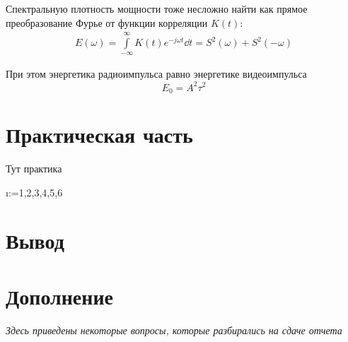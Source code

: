 Спектральную плотность мощности тоже несложно найти как прямое преобразование
Фурье от функции корреляции $K(t)$:
\begin{equation}
    \begin{gathered}
        E(\omega) = \int\limits_{-\infty}^{\infty} K(t) e^{-j\omega t} \dd t =
        S^2(\omega) + S^2(- \omega)
    \end{gathered}
\end{equation}


При этом энергетика радиоимпульса равно энергетике видеоимпульса
\begin{equation}
    \label{eq:}
    E_0 = A^2 \tau^2
\end{equation}


\newpage
\section{Практическая часть}
Тут практика

\makeatletter
\@for\i:={1,2,3,4,5,6}\do{ \newpage}
\makeatother


\section{Вывод}


\newpage
\section{Дополнение}
\textit{Здесь приведены некоторые вопросы, которые разбирались на сдаче отчета}


